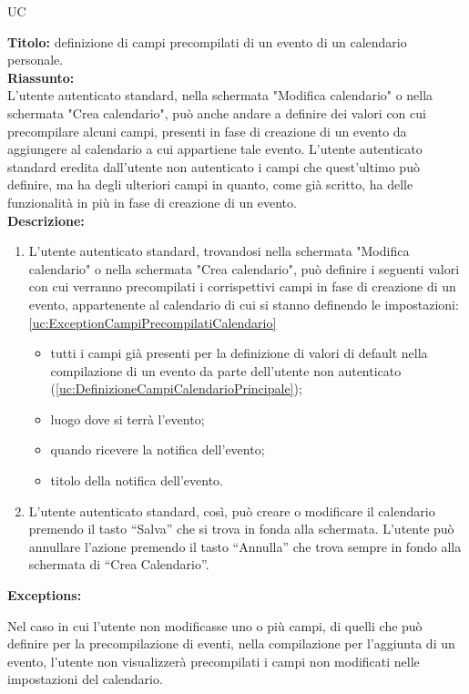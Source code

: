 \begin{listaPersonale}{UC}
\begin{listaPersonale2}[UC] {}
            \textbf{Titolo: } definizione di campi precompilati di un evento di un calendario personale. \\
            \textbf{Riassunto: } \\ L'utente autenticato standard, nella schermata "Modifica calendario" o nella schermata "Crea calendario", può anche andare a definire dei valori con cui precompilare alcuni campi, presenti in fase di creazione di un evento da aggiungere al calendario a cui appartiene tale evento. L'utente autenticato standard eredita dall'utente non autenticato i campi che quest'ultimo può definire, ma ha degli ulteriori campi in quanto, come già scritto, ha delle funzionalità in più in fase di creazione di un evento. \\
            \textbf{Descrizione: }
            \begin {enumerate}
        \item L'utente autenticato standard, trovandosi nella schermata "Modifica calendario" o nella schermata "Crea calendario", può definire i seguenti valori con cui verranno precompilati i corrispettivi campi in fase di creazione di un evento, appartenente al calendario di cui si stanno definendo le impostazioni: \ref{uc:ExceptionCampiPrecompilatiCalendario}
              \begin{itemize}
                  \item tutti i campi già presenti per la definizione di valori di default nella compilazione di un evento da parte dell'utente non autenticato (\ref{uc:DefinizioneCampiCalendarioPrincipale});
                  \item luogo dove si terrà l'evento;
                  \item quando ricevere la notifica dell'evento;
                  \item titolo della notifica dell'evento.
              \end{itemize}
        \item L'utente autenticato standard, così, può creare o modificare il calendario premendo il tasto “Salva” che si trova in fonda alla schermata. L'utente può annullare l'azione premendo il tasto “Annulla” che trova sempre in fondo alla schermata di “Crea Calendario”.
              \end{enumerate}
              \textbf{Exceptions:}
              \begin{enumerate}[label=\textbf{[exception \arabic{enumiii}]}, ref= \textbf{[exception \arabic{enumiii}]}]
                   Nel caso in cui l'utente non modificasse uno o più campi, di quelli che può definire per la precompilazione di eventi, nella compilazione per l'aggiunta di un evento, l'utente non visualizzerà precompilati i campi non modificati nelle impostazioni del calendario.
              \end{enumerate}



\end{listaPersonale2}
\end{listaPersonale}
